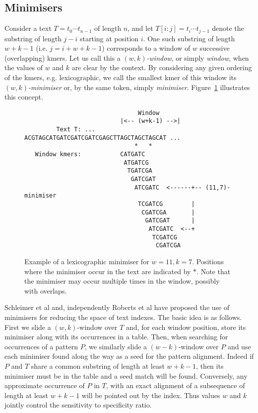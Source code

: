 \documentclass[a4paper, 12pt, oneside]{article}
\begin{document}
\subsection*{Minimisers}

Consider a text $T=t_0\cdots t_{n-1}$ of length $n$, and let $T[i:j]=t_i\cdots t_{j-1}$ denote the substring of length $j-i$\/ starting at position $i$. One such substring of length $w+k-1$ (i.e. $j=i+w+k-1$) corresponds to a window of $w$ successive (overlapping) kmers. Let us call this a \emph{$(w,k)$-window}, or simply \emph{window}, when the values of $w$ and $k$ are clear by the context. By considering any given ordering of the kmers, e.g. lexicographic, we call the smallest kmer of this window its \emph{$(w,k)$-minimiser} or, by the same token, simply \emph{minimiser}.
Figure~\ref{fig:minimiser} illustrates this concept.

\begin{figure}[htpb]
	\centering

	\begin{verbatim}
                                Window
                           |<-- (w+k-1) -->|  
         Text T: ... ACGTAGCATGATCGATCGATCGAGCTTAGCTAGCTAGCAT ...
                               *   *	
   Window kmers:           CATGATC
                            ATGATCG
                             TGATCGA
                              GATCGAT
                               ATCGATC  <------+-- (11,7)-minimiser 
                                TCGATCG        |
                                 CGATCGA       |
                                  GATCGAT      |
                                   ATCGATC  <--+
                                    TCGATCG
                                     CGATCGA
	\end{verbatim}
	\caption{Example of a lexicographic minimiser for $w=11, k=7$. Positions where the minimiser occur in the text are indicated by $*$. Note that the minimiser may occur multiple times in the window, possibly with overlaps.} 
	\label{fig:minimiser}
\end{figure}

Schleimer et al \cite{Schleimer2003} and, independently Roberts et al \cite{Roberts2004} have proposed the use of minimisers for reducing the space of text indexes. The basic idea is as follows. First we slide a $(w,k)$-window over $T$ and, for each window position, store its minimiser along with its occurrences in a table. Then, when searching for occurrences of a pattern $P$, we similarly slide a $(w-k)$-window over $P$ and use each minimiser found along the way as a seed for the pattern alignment. Indeed if $P$ and $T$ share a common substring of length at least $w+k-1$, then its minimiser must be in the table and a seed match will be found. Conversely, any approximate occurrence of $P$ in $T$, with an exact alignment of a subsequence of length at least $w+k-1$ will be pointed out by the index. Thus values $w$ and $k$ jointly control the sensitivity to specificity ratio.
\end{document}
